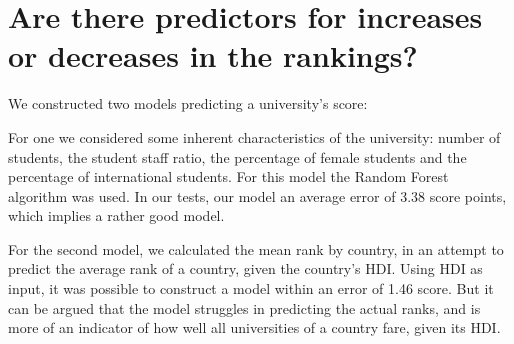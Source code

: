 \documentclass{article}
\begin{document}
\section*{\large{Are there predictors for increases or decreases in the rankings?}}
We constructed two models predicting a university's score: 

For one we considered some inherent characteristics of the university: number of students, the student staff ratio, the percentage of female students and the percentage of international students. For this model the Random Forest algorithm was used. In our tests, our model an average error of 3.38 score points, which implies a rather good model. 

For the second model, we calculated the mean rank by country, in an attempt to predict the average rank of a country, given the country's HDI. Using HDI as input, it was possible to construct a model within an error of 1.46 score. But it can be argued that the model struggles in predicting the actual ranks, and is more of an indicator of how well all universities of a country fare, given its HDI.
\end{document}
